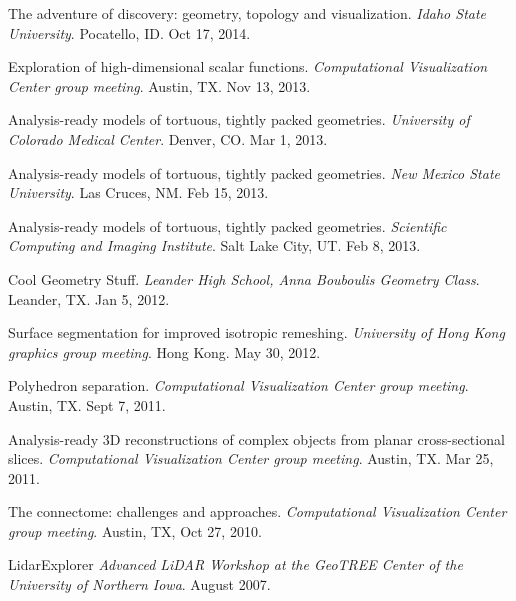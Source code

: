 \documentclass[margin,line]{res}
\begin{document}
\begin{resume}
\begin{LONG}
The adventure of discovery: geometry, topology and visualization.
\textit{Idaho State University}. Pocatello, ID. Oct 17, 2014.

Exploration of high-dimensional scalar functions.
\textit{Computational Visualization Center group meeting}. Austin, TX. Nov 13, 2013.

Analysis-ready models of tortuous, tightly packed geometries.
\textit{University of Colorado Medical Center}. Denver, CO. Mar 1, 2013.

Analysis-ready models of tortuous, tightly packed geometries.
\textit{New Mexico State University}. Las Cruces, NM. Feb 15, 2013.

Analysis-ready models of tortuous, tightly packed geometries.
\textit{Scientific Computing and Imaging Institute}. Salt Lake City,
UT. Feb 8, 2013.

Cool Geometry Stuff.
\textit{Leander High School, Anna Bouboulis Geometry Class}. Leander, TX. Jan 5, 2012.

Surface segmentation for improved isotropic remeshing.
\textit{University of Hong Kong graphics group meeting}. Hong Kong. May 30, 2012.

Polyhedron separation.
\textit{Computational Visualization Center group meeting}. Austin, TX. Sept 7, 2011.

Analysis-ready 3D reconstructions of complex objects from planar cross-sectional slices.
\textit{Computational Visualization Center group meeting}. Austin, TX. Mar 25, 2011.

The connectome: challenges and approaches.
\textit{Computational Visualization Center group meeting}. Austin, TX, Oct 27, 2010.

LidarExplorer
\textit{Advanced LiDAR Workshop at the GeoTREE Center of the University of Northern Iowa}. August 2007.

%
%


\end{LONG}


\end{resume}
\end{document}
